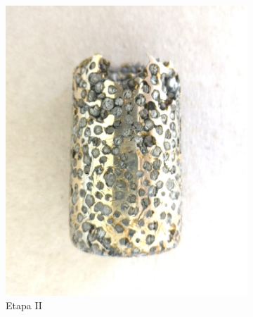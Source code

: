 \documentclass[a4paper,12pt,fleqn,twoside,openany]{book}
\begin{document}
\begin{figure}[h]
\begin{subfigure}{0.35\textwidth}
        \includegraphics[width=\textwidth]{Img/Procedimiento/proceso2.jpg}
        \caption{Etapa II}
        \label{fig:proceso2}
    \end{subfigure}
    \begin{subfigure}{0.28\textwidth}

\end{subfigure}
\end{figure}
\end{document}
